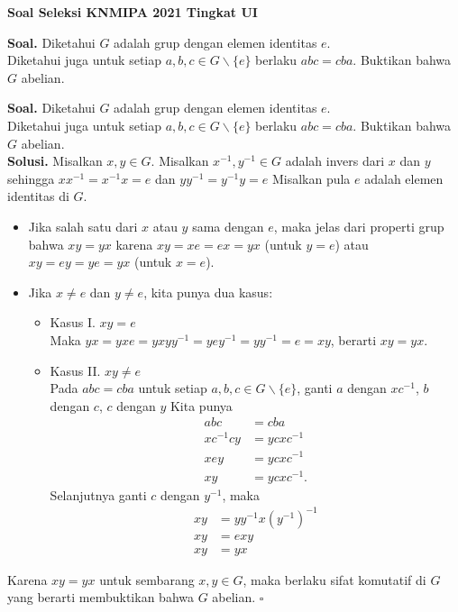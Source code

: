 	\begin{center}
    \textbf{\Huge Soal Seleksi KNMIPA 2021 Tingkat UI}
\end{center}


		 \textbf{Soal. }Diketahui $G$ adalah grup dengan elemen identitas $e$.\\ Diketahui juga untuk setiap $a,b,c \in G \backslash \{e\}$ berlaku $abc=cba$. Buktikan bahwa $G$ abelian.
	
	\newpage
	
	\textbf{Soal. }Diketahui $G$ adalah grup dengan elemen identitas $e$.\\ Diketahui juga untuk setiap $a,b,c \in G \backslash \{e\}$ berlaku $abc=cba$. Buktikan bahwa $G$ abelian.\\
	
	\textbf{Solusi. } Misalkan $x,y \in G$. Misalkan $x^{-1},y^{-1}\in G$ adalah invers dari $x$ dan $y$ sehingga $xx^{-1} = x^{-1}x=e$ dan $yy^{-1}=y^{-1}y=e$ Misalkan pula $e$ adalah elemen identitas di $G$.
	 \begin{itemize}
	 	\item Jika salah satu dari $x$ atau $y$ sama dengan $e$, maka jelas dari properti grup bahwa $xy = yx$ karena $xy = xe = ex = yx$ (untuk $y=e$) atau $xy = ey = ye = yx$ (untuk $x=e$). 
	 	\item Jika $x \neq e$ dan $y \neq e$, kita punya dua kasus:
	 	\begin{itemize}
	 		\item Kasus I. $xy = e$\\ Maka $yx = yxe = yxyy^{-1} = yey^{-1} = yy^{-1} = e = xy$, berarti $xy = yx$.
	 		\item Kasus II. $xy \neq e$\\Pada $abc = cba$ untuk setiap $a,b,c \in G\backslash\{e\}$, ganti $a$ dengan $xc^{-1}$, $b$ dengan $c$, $c$ dengan $y$ Kita punya \begin{align*}
	 			abc &= cba\\
	 			xc^{-1}cy &= ycxc^{-1}\\
	 			xey &= ycxc^{-1}\\
	 			xy &= ycxc^{-1}.
	 		\end{align*}
 		Selanjutnya ganti $c$ dengan $y^{-1}$, maka
 		\begin{align*}
 			xy &= yy^{-1}x(y^{-1})^{-1}\\
 			xy &= exy\\
 			xy &= yx
 		\end{align*}
	 	\end{itemize}
	 \end{itemize}
	Karena $xy = yx$ untuk sembarang $x,y\in G$, maka berlaku sifat komutatif di $G$ yang berarti membuktikan bahwa $G$ abelian. $\square$
